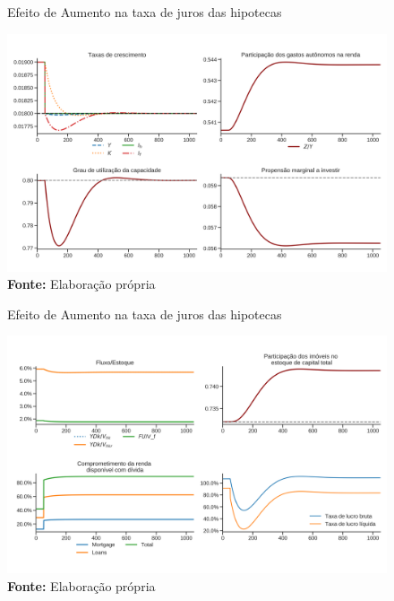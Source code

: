 \begin{figure}[H]
	\centering
	\caption{Efeito de Aumento na taxa de juros das hipotecas}
	\label{choque_3}
	\includegraphics[width=\textwidth]{../../Modelo/Versoes/Shock_3.png}
	\caption*{\textbf{Fonte:} Elaboração própria}
\end{figure}


\begin{figure}[H]
	\centering
	\caption{Efeito de Aumento na taxa de juros das hipotecas}
	\label{choque_3Norms}
	\includegraphics[width=\textwidth]{../../Modelo/Versoes/Shock_3Norms.png}
	\caption*{\textbf{Fonte:} Elaboração própria}
\end{figure}

